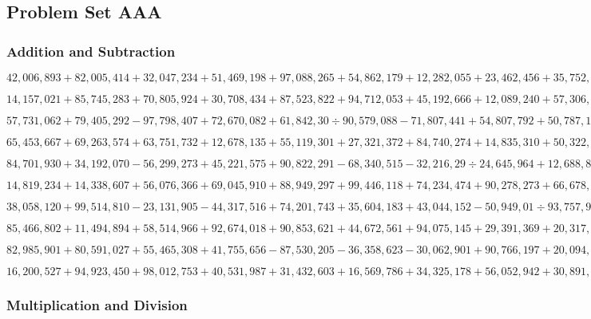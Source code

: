 \hypertarget{problem-set-aaa-15}{%
\subsection{Problem Set AAA}\label{problem-set-aaa-15}}

\hypertarget{addition-and-subtraction-371}{%
\subsubsection{Addition and
Subtraction}\label{addition-and-subtraction-371}}

\(42,006,893+82,005,414+32,047,234+51,469,198+97,088,265+54,862,179+12,282,055+23,462,456+35,752,691+76,106,182\)

\(14,157,021+85,745,283+70,805,924+30,708,434+87,523,822+94,712,053+45,192,666+12,089,240+57,306,702+38,091,605\)

\(57,731,062+79,405,292-97,798,407+72,670,082+61,842,30÷90,579,088-71,807,441+54,807,792+50,787,175-18,910,705\)

\(65,453,667+69,263,574+63,751,732+12,678,135+55,119,301+27,321,372+84,740,274+14,835,310+50,322,761+97,770,863\)

\(84,701,930+34,192,070-56,299,273+45,221,575+90,822,291-68,340,515-32,216,29÷24,645,964+12,688,835+44,216,675\)

\(14,819,234+14,338,607+56,076,366+69,045,910+88,949,297+99,446,118+74,234,474+90,278,273+66,678,149+24,464,123\)

\(38,058,120+99,514,810-23,131,905-44,317,516+74,201,743+35,604,183+43,044,152-50,949,01÷93,757,902+64,758,211\)

\(85,466,802+11,494,894+58,514,966+92,674,018+90,853,621+44,672,561+94,075,145+29,391,369+20,317,001+87,915,530\)

\(82,985,901+80,591,027+55,465,308+41,755,656-87,530,205-36,358,623-30,062,901+90,766,197+20,094,469-41,524,681\)

\(16,200,527+94,923,450+98,012,753+40,531,987+31,432,603+16,569,786+34,325,178+56,052,942+30,891,893+31,154,310\)

\hypertarget{multiplication-and-division-370}{%
\subsubsection{Multiplication and
Division}\label{multiplication-and-division-370}}

